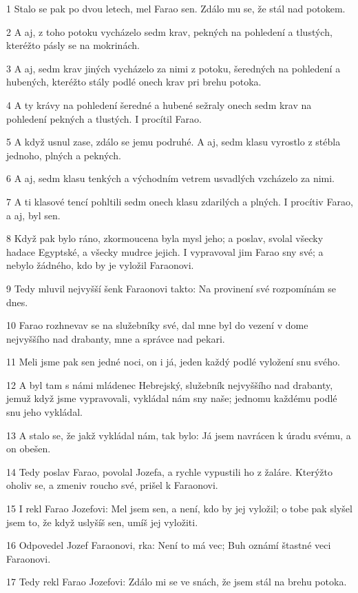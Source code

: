 \par 1 Stalo se pak po dvou letech, mel Farao sen. Zdálo mu se, že stál nad potokem.
\par 2 A aj, z toho potoku vycházelo sedm krav, pekných na pohledení a tlustých, kteréžto pásly se na mokrinách.
\par 3 A aj, sedm krav jiných vycházelo za nimi z potoku, šeredných na pohledení a hubených, kteréžto stály podlé onech krav pri brehu potoka.
\par 4 A ty krávy na pohledení šeredné a hubené sežraly onech sedm krav na pohledení pekných a tlustých. I procítil Farao.
\par 5 A když usnul zase, zdálo se jemu podruhé. A aj, sedm klasu vyrostlo z stébla jednoho, plných a pekných.
\par 6 A aj, sedm klasu tenkých a východním vetrem usvadlých vzcházelo za nimi.
\par 7 A ti klasové tencí pohltili sedm onech klasu zdarilých a plných. I procítiv Farao, a aj, byl sen.
\par 8 Když pak bylo ráno, zkormoucena byla mysl jeho; a poslav, svolal všecky hadace Egyptské, a všecky mudrce jejich. I vypravoval jim Farao sny své; a nebylo žádného, kdo by je vyložil Faraonovi.
\par 9 Tedy mluvil nejvyšší šenk Faraonovi takto: Na provinení své rozpomínám se dnes.
\par 10 Farao rozhnevav se na služebníky své, dal mne byl do vezení v dome nejvyššího nad drabanty, mne a správce nad pekari.
\par 11 Meli jsme pak sen jedné noci, on i já, jeden každý podlé vyložení snu svého.
\par 12 A byl tam s námi mládenec Hebrejský, služebník nejvyššího nad drabanty, jemuž když jsme vypravovali, vykládal nám sny naše; jednomu každému podlé snu jeho vykládal.
\par 13 A stalo se, že jakž vykládal nám, tak bylo: Já jsem navrácen k úradu svému, a on obešen.
\par 14 Tedy poslav Farao, povolal Jozefa, a rychle vypustili ho z žaláre. Kterýžto oholiv se, a zmeniv roucho své, prišel k Faraonovi.
\par 15 I rekl Farao Jozefovi: Mel jsem sen, a není, kdo by jej vyložil; o tobe pak slyšel jsem to, že když uslyšíš sen, umíš jej vyložiti.
\par 16 Odpovedel Jozef Faraonovi, rka: Není to má vec; Buh oznámí štastné veci Faraonovi.
\par 17 Tedy rekl Farao Jozefovi: Zdálo mi se ve snách, že jsem stál na brehu potoka.
